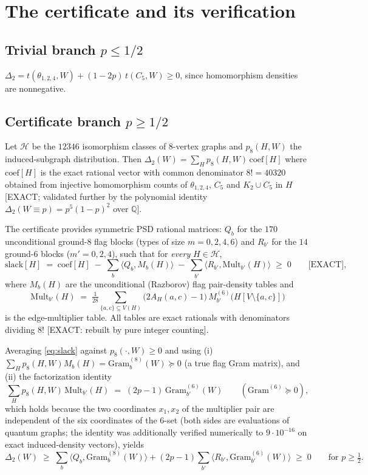 \documentclass[11pt]{amsart}
\newcommand{\thet}{\theta_{1,2,4}}
\begin{document}
\section{The certificate and its verification}

\subsection{Trivial branch $p\le 1/2$}
$\Delta_2 = t(\thet,W) + (1-2p)\,t(C_5,W)\ge 0$, since homomorphism
densities are nonnegative.

\subsection{Certificate branch $p\ge 1/2$}
Let $\mathcal H$ be the $12346$ isomorphism classes of $8$-vertex graphs and
$p_8(H,W)$ the induced-subgraph distribution.  Then
$\Delta_2(W)=\sum_H p_8(H,W)\,\mathrm{coef}[H]$ where
$\mathrm{coef}[H]$ is the exact rational vector with common denominator
$8!=40320$ obtained from injective homomorphism counts of $\thet$, $C_5$ and
$K_2\cup C_5$ in $H$ [EXACT; validated further by the polynomial identity
$\Delta_2(W\equiv p)=p^5(1-p)^2$ over $\mathbb{Q}$].

The certificate provides symmetric PSD rational matrices: $Q_b$ for the
$170$ unconditional ground-$8$ flag blocks (types of size $m=0,2,4,6$) and
$R_{b'}$ for the $14$ ground-$6$ blocks ($m'=0,2,4$), such that for
\emph{every} $H\in\mathcal H$,
\begin{equation}\label{eq:slack}
\mathrm{slack}[H]\;=\;\mathrm{coef}[H]\;-\;\sum_b \langle Q_b, M_b(H)\rangle
\;-\;\sum_{b'} \langle R_{b'}, \mathrm{Mult}_{b'}(H)\rangle \;\ge\;0
\qquad\text{[EXACT]},
\end{equation}
where $M_b(H)$ are the unconditional (Razborov) flag pair-density tables and
\[
\mathrm{Mult}_{b'}(H)\;=\;\tfrac1{28}\sum_{\{a,c\}\subseteq V(H)}
\bigl(2A_H(a,c)-1\bigr)\,M^{(6)}_{b'}\!\bigl(H[V\setminus\{a,c\}]\bigr)
\]
is the edge-multiplier table.  All tables are exact rationals with
denominators dividing $8!$ [EXACT: rebuilt by pure integer counting].

Averaging \eqref{eq:slack} against $p_8(\cdot,W)\ge0$ and using
(i) $\sum_H p_8(H,W)M_b(H)=\mathrm{Gram}^{(8)}_b(W)\succeq 0$ (a true flag
Gram matrix), and (ii) the factorization identity
\[
\sum_H p_8(H,W)\,\mathrm{Mult}_{b'}(H) \;=\;(2p-1)\,
\mathrm{Gram}^{(6)}_{b'}(W)\qquad(\mathrm{Gram}^{(6)}\succeq0),
\]
which holds because the two coordinates $x_1,x_2$ of the multiplier pair are
independent of the six coordinates of the $6$-set (both sides are
evaluations of quantum graphs; the identity was additionally verified
numerically to $9\cdot10^{-16}$ on exact induced-density vectors), yields
\[
\Delta_2(W)\;\ge\;\sum_b\langle Q_b,\mathrm{Gram}^{(8)}_b(W)\rangle
+(2p-1)\sum_{b'}\langle R_{b'},\mathrm{Gram}^{(6)}_{b'}(W)\rangle\;\ge\;0
\qquad\text{for } p\ge\tfrac12 .
\]
\end{document}

